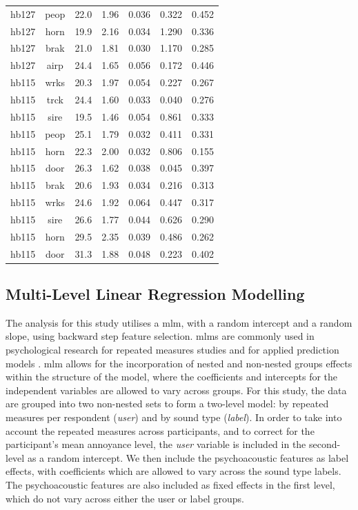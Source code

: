 \begin{table}
{\begin{tabular}{ccccccc}
hb127 & peop & 22.0 & 1.96 & 0.036 & 0.322 & 0.452 \\
hb127 & horn & 19.9 & 2.16 & 0.034 & 1.290 & 0.336 \\
hb127 & brak & 21.0 & 1.81 & 0.030 & 1.170 & 0.285 \\
hb127 & airp & 24.4 & 1.65 & 0.056 & 0.172 & 0.446 \\ 
\hline
hb115 & wrks & 20.3 & 1.97 & 0.054 & 0.227 & 0.267 \\
hb115 & trck & 24.4 & 1.60 & 0.033 & 0.040 & 0.276 \\
hb115 & sire & 19.5 & 1.46 & 0.054 & 0.861 & 0.333 \\
hb115 & peop & 25.1 & 1.79 & 0.032 & 0.411 & 0.331 \\
hb115 & horn & 22.3 & 2.00 & 0.032 & 0.806 & 0.155 \\
hb115 & door & 26.3 & 1.62 & 0.038 & 0.045 & 0.397 \\
hb115 & brak & 20.6 & 1.93 & 0.034 & 0.216 & 0.313 \\ 
\hline
hb115 & wrks & 24.6 & 1.92 & 0.064 & 0.447 & 0.317 \\
hb115 & sire & 26.6 & 1.77 & 0.044 & 0.626 & 0.290 \\
hb115 & horn & 29.5 & 2.35 & 0.039 & 0.486 & 0.262 \\
hb115 & door & 31.3 & 1.88 & 0.048 & 0.223 & 0.402 \\
\bottomrule
\end{tabular}
}
\end{table}

\subsection{Multi-Level Linear Regression Modelling}

The analysis for this study utilises a \gls{mlm}, with a random intercept and a random slope, using backward step feature selection. \glspl{mlm} are commonly used in psychological research for repeated measures studies \citep{Quene2004multi,VolpertEsmond2021Using} and for applied prediction models \citep{Gelman2006Multilevel,Frees2006Multilevel}. \gls{mlm} allows for the incorporation of nested and non-nested groups effects within the structure of the model, where the coefficients and intercepts for the independent variables are allowed to vary across groups. For this study, the data are grouped into two non-nested sets to form a two-level model: by repeated measures per respondent (\emph{user}) and by sound type (\emph{label}). In order to take into account the repeated measures across participants, and to correct for the participant's mean annoyance level, the \emph{user} variable is included in the second-level as a random intercept. We then include the psychoacoustic features as label effects, with coefficients which are allowed to vary across the sound type labels. The psychoacoustic features are also included as fixed effects in the first level, which do not vary across either the user or label groups.

